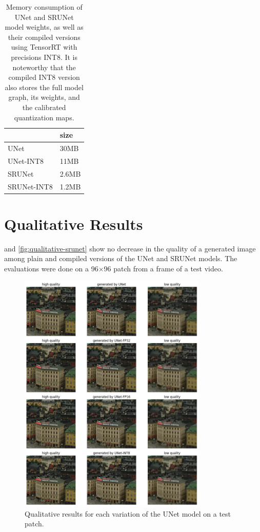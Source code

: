 \begin{table}[t]
\begin{tabular}{ll}
\toprule
{} &      size \\
\midrule
UNet        & 30MB \\
UNet-INT8   & 11MB \\
\midrule
SRUNet      & 2.6MB \\
SRUNet-INT8 & 1.2MB \\
\bottomrule
\end{tabular}
\caption{Memory consumption of UNet and SRUNet model weights, as well as their compiled versions using TensorRT with precisions INT8. It is noteworthy that the compiled INT8 version also stores the full model graph, its weights, and the calibrated quantization maps.}
\label{tab:memory-consumption}
\end{table}

\clearpage

\section{Qualitative Results}
\label{sec:qualitative-results}

 and \cref{fig:qualitative-srunet} show no decrease in the quality of a generated image among plain and compiled versions of the UNet and SRUNet models. The evaluations were done on a 96$\times$96 patch from a frame of a test video.

\begin{figure}[ht]
\includegraphics[width=0.8\textwidth]{static/unet_qualitative_results.png}
\caption{Qualitative results for each variation of the UNet model on a test patch.}
\label{fig:qualitative-unet}
\end{figure}

